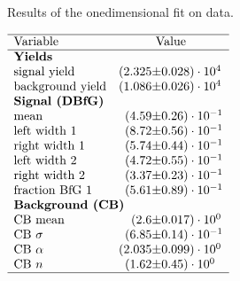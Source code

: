  
\begin{table}[h]
    \centering
    \caption{Results of the onedimensional \logIP fit on data.}
    \label{tab:logIP_RS}
    $\begin{array}{lr@{\pm}l}
    \hline
    \text{Variable} & \multicolumn{2}{c}{\text{Value}} \\
    \hline
        \multicolumn{3}{l}{\text{\textbf{Yields}}} \\
\text{signal yield}&(2.325 & 0.028) \cdot 10^{4}\\
\text{background yield}&(1.086 & 0.026) \cdot 10^{4}\\
\multicolumn{3}{l}{\text{\textbf{Signal (\DBfG)}}} \\
\text{mean}&(4.59 & 0.26) \cdot 10^{-1}\\
\text{left width 1}&(8.72 & 0.56) \cdot 10^{-1}\\
\text{right width 1}&(5.74 & 0.44) \cdot 10^{-1}\\
\text{left width 2}&(4.72 & 0.55) \cdot 10^{-1}\\
\text{right width 2}&(3.37 & 0.23) \cdot 10^{-1}\\
\text{fraction BfG 1}&(5.61 & 0.89) \cdot 10^{-1}\\
\multicolumn{3}{l}{\text{\textbf{Background (\CB)}}} \\
\text{CB mean}&(2.6 & 0.017) \cdot 10^{0}\\
\text{CB $\sigma$}&(6.85 & 0.14) \cdot 10^{-1}\\
\text{CB $\alpha$}&(2.035 & 0.099) \cdot 10^{0}\\
\text{CB $n$}&(1.62 & 0.45) \cdot 10^{0}\\

\hline
\end{array}$
\end{table}
    